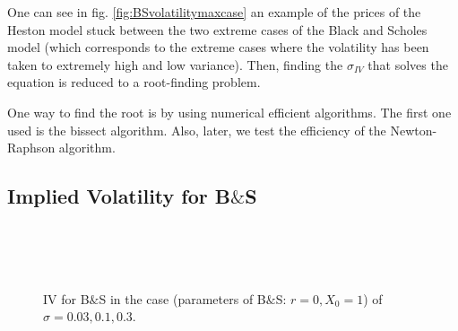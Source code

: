 One can see in fig. \ref{fig:BSvolatilitymaxcase} an example of the prices of the Heston model stuck between the two extreme cases of the Black and Scholes model (which corresponds to the extreme cases where the volatility has been taken to extremely high and low variance). Then, finding the $\sigma_{IV}$ that solves the equation is reduced to a root-finding problem.

One way to find the root is by using numerical efficient algorithms. The first one used is the bissect algorithm. Also, later, we test the efficiency of the Newton-Raphson algorithm.
\subsection{Implied Volatility for B$\&$S}
\begin{figure}
\centering
{}\\
\\
\\
\caption{IV for B$\&$S in the case (parameters of B$\&$S: $r = 0, X_0 = 1$) of $\sigma = 0.03, 0.1, 0.3$.}
\label{BSIVflat}
\end{figure}

